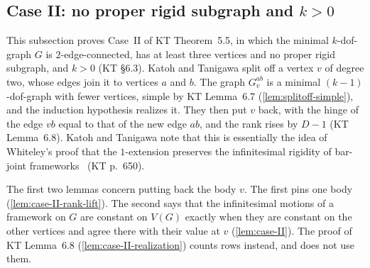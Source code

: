 \subsection{Case II: no proper rigid subgraph and \texorpdfstring{$k > 0$}{k > 0}}
\label{sec:molecular-algebraic-induction-caseII}

This subsection proves Case~II of KT Theorem~5.5, in which the minimal
$k$-dof-graph $G$ is $2$-edge-connected, has at least three vertices
and no proper rigid subgraph, and $k > 0$ (KT \S6.3). Katoh and
Tanigawa split off a vertex $v$ of degree two, whose edges join it to
vertices $a$ and $b$. The graph $G_v^{ab}$ is a minimal
$(k-1)$-dof-graph with fewer vertices, simple by KT Lemma~6.7
(\cref{lem:splitoff-simple}), and the induction hypothesis realizes
it. They then put $v$ back, with the hinge of the edge $vb$
equal to that of the new edge $ab$, and the rank rises by $D - 1$ (KT
Lemma~6.8). Katoh and Tanigawa note that this is essentially the idea
of Whiteley's proof that the $1$-extension preserves the infinitesimal
rigidity of bar-joint frameworks~\cite[Theorem~2.2.2]{whiteley1996}
(KT p.~650).

The first two lemmas concern putting back the body $v$. The first pins
one body (\cref{lem:case-II-rank-lift}). The second says that the
infinitesimal motions of a framework on $G$ are constant on $V(G)$
exactly when they are constant on the other vertices and agree there
with their value at $v$ (\cref{lem:case-II}). The proof of KT
Lemma~6.8 (\cref{lem:case-II-realization}) counts rows instead, and
does not use them.

